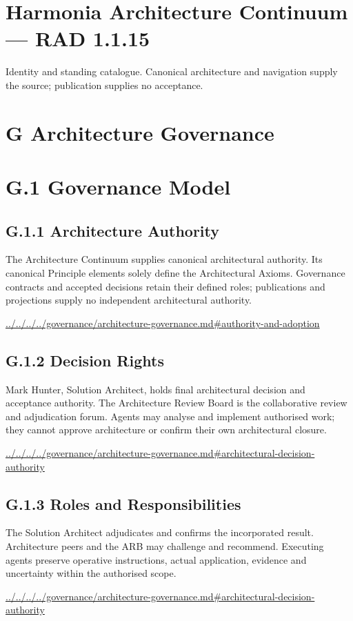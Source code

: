 \documentclass[10pt,a4paper]{article}
\begin{document}
\section*{Harmonia Architecture Continuum — RAD 1.1.15}
Identity and standing catalogue. Canonical architecture and navigation supply the source; publication supplies no acceptance.\par
\section*{G Architecture Governance}
\section*{G.1 Governance Model}
\subsection*{G.1.1 Architecture Authority}
The Architecture Continuum supplies canonical architectural authority. Its canonical Principle elements solely define the Architectural Axioms. Governance contracts and accepted decisions retain their defined roles; publications and projections supply no independent architectural authority.\par
{\footnotesize\url{../../../../governance/architecture-governance.md#authority-and-adoption}}\par
\subsection*{G.1.2 Decision Rights}
Mark Hunter, Solution Architect, holds final architectural decision and acceptance authority. The Architecture Review Board is the collaborative review and adjudication forum. Agents may analyse and implement authorised work; they cannot approve architecture or confirm their own architectural closure.\par
{\footnotesize\url{../../../../governance/architecture-governance.md#architectural-decision-authority}}\par
\subsection*{G.1.3 Roles and Responsibilities}
The Solution Architect adjudicates and confirms the incorporated result. Architecture peers and the ARB may challenge and recommend. Executing agents preserve operative instructions, actual application, evidence and uncertainty within the authorised scope.\par
{\footnotesize\url{../../../../governance/architecture-governance.md#architectural-decision-authority}}\par
\end{document}
